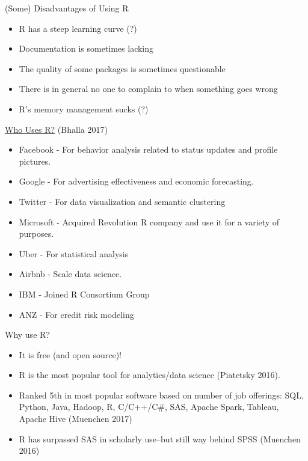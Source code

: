 \begin{frame}{(Some) Disadvantages of Using R}

\begin{itemize}
\tightlist
\item
  R has a steep learning curve (?)
\item
  Documentation is sometimes lacking
\item
  The quality of some packages is sometimes questionable
\item
  There is in general no one to complain to when something goes wrong
\item
  R's memory management sucks (?)
\end{itemize}

\end{frame}

\begin{frame}{\href{https://www.datasciencecentral.com/profiles/blogs/list-of-companies-using-r}{Who
Uses R?} (Bhalla 2017)}

\begin{itemize}
\tightlist
\item
  Facebook - For behavior analysis related to status updates and profile
  pictures.
\item
  Google - For advertising effectiveness and economic forecasting.
\item
  Twitter - For data visualization and semantic clustering
\item
  Microsoft - Acquired Revolution R company and use it for a variety of
  purposes.
\item
  Uber - For statistical analysis
\item
  Airbnb - Scale data science.
\item
  IBM - Joined R Consortium Group
\item
  ANZ - For credit risk modeling
\end{itemize}

\end{frame}

\begin{frame}{Why use R?}

\begin{itemize}
\tightlist
\item
  It is free (and open source)!
\item
  R is the most popular tool for analytics/data science (Piatetsky
  2016).
\item
  Ranked 5th in most popular software based on number of job offerings:
  SQL, Python, Java, Hadoop, R, C/C++/C\#, SAS, Apache Spark, Tableau,
  Apache Hive (Muenchen 2017)
\item
  R has surpassed SAS in scholarly use--but still way behind SPSS
  (Muenchen 2016)
\end{itemize}

\end{frame}


